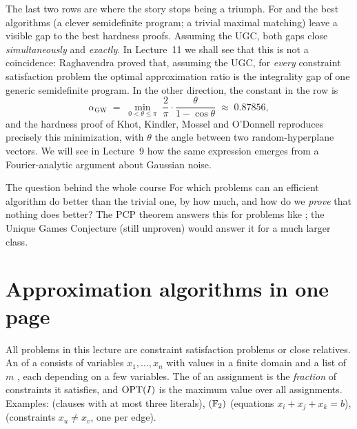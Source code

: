 The last two rows are where the story stops being a triumph.  For  and
 the best algorithms (a clever semidefinite program; a trivial maximal matching)
leave a visible gap to the best hardness proofs.  Assuming the UGC, both gaps close
\emph{simultaneously} and \emph{exactly}.  In Lecture~11 we shall see that this is not a
coincidence: Raghavendra \citep{Raghavendra08} proved that, assuming the UGC, for \emph{every}
constraint satisfaction problem the optimal approximation ratio is the integrality gap of
one generic semidefinite program.  In the other direction, the constant in the  row is
\begin{equation}\label{eq:alphaGW}
  \alpha_{\mathrm{GW}} \;=\; \min_{0<\theta\le\pi}\;\frac{2}{\pi}\cdot\frac{\theta}{1-\cos\theta}\;\approx\;0.87856,
\end{equation}
and the hardness proof of Khot, Kindler, Mossel and O'Donnell reproduces precisely this
minimization, with $\theta$ the angle between two random-hyperplane vectors.
We will see in Lecture~9 how the same expression emerges from a Fourier-analytic argument
about Gaussian noise.

\begin{bigpicture}[unbreakable]{The question behind the whole course}
For which problems can an efficient algorithm do better than the trivial one, by how much, and
how do we \emph{prove} that nothing does better?  The PCP theorem answers this for problems
like ; the Unique Games Conjecture (still unproven) would answer it for a much
larger class.
\end{bigpicture}


\section{Approximation algorithms in one page}
\label{sec:approx}

All problems in this lecture are constraint satisfaction problems or close relatives.  An
 of a  consists of variables $x_1,\dots,x_n$ with values in a
finite domain and a list of $m$ , each depending on a few variables.  The
 of an assignment is the \emph{fraction} of constraints it satisfies, and
$\operatorname{OPT}(I)$ is the maximum value over all assignments.  Examples:
 (clauses with at most three literals),
$(\mathbb{F}_2)$ (equations $x_i+x_j+x_k=b$),
 (constraints $x_u\ne x_v$, one per edge).

